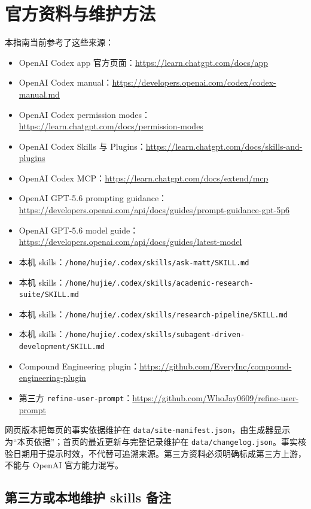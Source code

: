 \documentclass[UTF8,a4paper,11pt,fontset=none]{ctexart}
\newcommand{\skill}[1]{\texttt{#1}}
\newcommand{\file}[1]{\texttt{#1}}
\begin{document}
\section{官方资料与维护方法}

本指南当前参考了这些来源：

\begin{itemize}
  \item OpenAI Codex app 官方页面：\url{https://learn.chatgpt.com/docs/app}
  \item OpenAI Codex manual：\url{https://developers.openai.com/codex/codex-manual.md}
  \item OpenAI Codex permission modes：\url{https://learn.chatgpt.com/docs/permission-modes}
  \item OpenAI Codex Skills 与 Plugins：\url{https://learn.chatgpt.com/docs/skills-and-plugins}
  \item OpenAI Codex MCP：\url{https://learn.chatgpt.com/docs/extend/mcp}
  \item OpenAI GPT-5.6 prompting guidance：\url{https://developers.openai.com/api/docs/guides/prompt-guidance-gpt-5p6}
  \item OpenAI GPT-5.6 model guide：\url{https://developers.openai.com/api/docs/guides/latest-model}
  \item 本机 skills：\file{/home/hujie/.codex/skills/ask-matt/SKILL.md}
  \item 本机 skills：\file{/home/hujie/.codex/skills/academic-research-suite/SKILL.md}
  \item 本机 skills：\file{/home/hujie/.codex/skills/research-pipeline/SKILL.md}
  \item 本机 skills：\file{/home/hujie/.codex/skills/subagent-driven-development/SKILL.md}
  \item Compound Engineering plugin：\url{https://github.com/EveryInc/compound-engineering-plugin}
  \item 第三方 \skill{refine-user-prompt}：\url{https://github.com/WhoJay0609/refine-user-prompt}
\end{itemize}

网页版本把每页的事实依据维护在 \file{data/site-manifest.json}，由生成器显示为“本页依据”；首页的最近更新与完整记录维护在 \file{data/changelog.json}。事实核验日期用于提示时效，不代替可追溯来源。第三方资料必须明确标成第三方上游，不能与 OpenAI 官方能力混写。

\subsection{第三方或本地维护 skills 备注}
\end{document}
